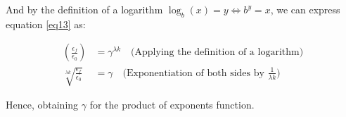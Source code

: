 And by the definition of a logarithm $\log_b(x) = y \Leftrightarrow b^y = x$, we can express equation \ref{eq13} as:

\begin{align}
	\left(\frac{\epsilon_f}{\epsilon_0}\right) &= \gamma^{\lambda k} \quad \text{(Applying the definition of a logarithm)} \label{eq14} \\
	\sqrt[\lambda k]{\frac{\epsilon_f}{\epsilon_0}} &=\gamma \quad \text{(Exponentiation of both sides by $\frac{1}{\lambda k}$)} \label{eq15}
\end{align}

Hence, obtaining $\gamma$ for the product of exponents function.

